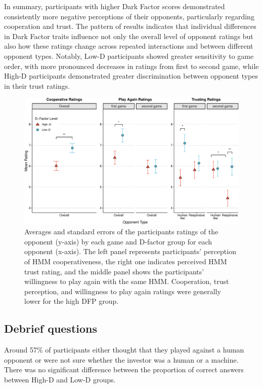 \documentclass[
]{article}
\begin{document}
In summary, participants with higher Dark Factor scores demonstrated consistently more negative perceptions of their opponents, particularly regarding cooperation and trust. The pattern of results indicates that individual differences in Dark Factor traits influence not only the overall level of opponent ratings but also how these ratings change across repeated interactions and between different opponent types. Notably, Low-D participants showed greater sensitivity to game order, with more pronounced decreases in ratings from first to second game, while High-D participants demonstrated greater discrimination between opponent types in their trust ratings.

\begin{figure}[H]

{\centering \includegraphics[width=\textwidth]{article_files/figure-latex/plotRatings-1} 

}

\caption{Averages and standard errors of the participants ratings of the opponent (y-axis) by each game and D-factor group for each opponent (x-axis). The left panel represents participants' perception of HMM cooperativeness, the right one indicates perceived HMM trust rating, and the middle panel shows the participants' willingness to play again with the same HMM. Cooperation, trust perception, and willingness to play again ratings were generally lower for the high DFP group.}\label{fig:plotRatings}
\end{figure}

\subsection{Debrief questions}\label{debrief-questions}

Around 57\% of participants either thought that they played against a human opponent or were not sure whether the investor was a human or a machine. There was no significant difference between the proportion of correct answers between High-D and Low-D groups.
\end{document}
